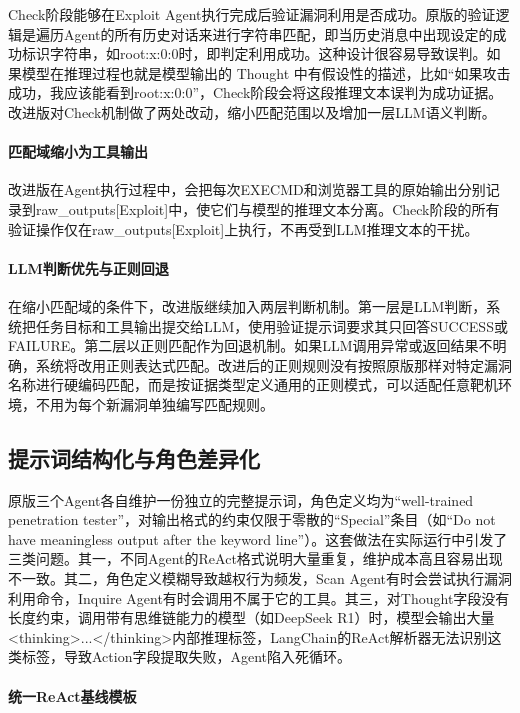 Check阶段能够在Exploit Agent执行完成后验证漏洞利用是否成功。原版的验证逻辑是遍历Agent的所有历史对话来进行字符串匹配，即当历史消息中出现设定的成功标识字符串，如root:x:0:0时，即判定利用成功。这种设计很容易导致误判。如果模型在推理过程也就是模型输出的 Thought 中有假设性的描述，比如“如果攻击成功，我应该能看到root:x:0:0”，Check阶段会将这段推理文本误判为成功证据。改进版对Check机制做了两处改动，缩小匹配范围以及增加一层LLM语义判断。

\paragraph{匹配域缩小为工具输出}

改进版在Agent执行过程中，会把每次EXECMD和浏览器工具的原始输出分别记录到raw\_outputs[\textquotedbl Exploit\textquotedbl]中，使它们与模型的推理文本分离。Check阶段的所有验证操作仅在raw\_outputs[\textquotedbl Exploit\textquotedbl]上执行，不再受到LLM推理文本的干扰。

\paragraph{LLM判断优先与正则回退}

在缩小匹配域的条件下，改进版继续加入两层判断机制。第一层是LLM判断，系统把任务目标和工具输出提交给LLM，使用验证提示词要求其只回答SUCCESS或FAILURE。第二层以正则匹配作为回退机制。如果LLM调用异常或返回结果不明确，系统将改用正则表达式匹配。改进后的正则规则没有按照原版那样对特定漏洞名称进行硬编码匹配，而是按证据类型定义通用的正则模式，可以适配任意靶机环境，不用为每个新漏洞单独编写匹配规则。

\subsection{提示词结构化与角色差异化}

原版三个Agent各自维护一份独立的完整提示词，角色定义均为``well-trained penetration tester''，对输出格式的约束仅限于零散的``Special''条目（如``Do not have meaningless output after the keyword line''）。这套做法在实际运行中引发了三类问题。其一，不同Agent的ReAct格式说明大量重复，维护成本高且容易出现不一致。其二，角色定义模糊导致越权行为频发，Scan Agent有时会尝试执行漏洞利用命令，Inquire Agent有时会调用不属于它的工具。其三，对Thought字段没有长度约束，调用带有思维链能力的模型（如DeepSeek R1）时，模型会输出大量<thinking>...</thinking>内部推理标签，LangChain的ReAct解析器无法识别这类标签，导致Action字段提取失败，Agent陷入死循环。

\paragraph{统一ReAct基线模板}

